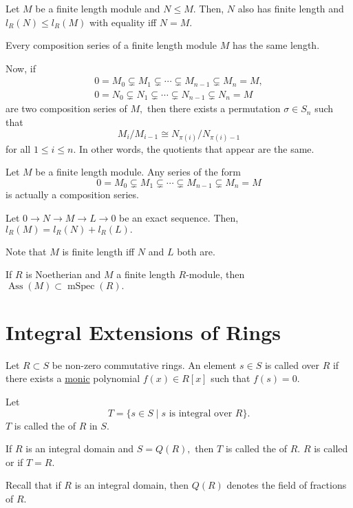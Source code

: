 \documentclass[12pt]{article}	%
\DeclareMathOperator{\Ass}{Ass}
\DeclareMathOperator{\mSpec}{mSpec}
\begin{document}
\begin{prop}
	Let $M$ be a finite length module and $N \le M.$ Then, $N$ also has finite length and $l_R(N) \le l_R(M)$ with equality iff $N = M.$
\end{prop}
\begin{thm}
	Every composition series of a finite length module $M$ has the same length.

	Now, if
	\begin{align*} 
		0 = M_0 \subsetneq M_1 \subsetneq \cdots \subsetneq M_{n-1} \subsetneq M_n = M,\\
		0 = N_0 \subsetneq N_1 \subsetneq \cdots \subsetneq N_{n-1} \subsetneq N_n = M
	\end{align*}
	are two composition series of $M,$ then there exists a permutation $\sigma \in S_n$ such that
	\begin{equation*} 
		M_{i}/M_{i - 1} \cong N_{\pi(i)}/N_{\pi(i) - 1}
	\end{equation*}
	for all $1 \le i \le n.$ In other words, the quotients that appear are the same.
\end{thm}

\begin{prop}
	Let $M$ be a finite length module. Any series of the form
	\begin{equation*} 
		0 = M_0 \subsetneq M_1 \subsetneq \cdots \subsetneq M_{n-1} \subsetneq M_n = M
	\end{equation*}
	is actually a composition series.
\end{prop}

\begin{prop}
	Let $0 \to N \to M \to L \to 0$ be an exact sequence. Then, $l_R(M) = l_R(N) + l_R(L).$
\end{prop}
Note that $M$ is finite length iff $N$ and $L$ both are.

\begin{prop}
	If $R$ is Noetherian and $M$ a finite length $R$-module, then $\Ass(M) \subset \mSpec(R).$
\end{prop}

\section{Integral Extensions of Rings}

\begin{defn}%
	Let $R \subset S$ be non-zero commutative rings. An element $s \in S$ is called  over $R$ if there exists a \underline{monic} polynomial $f(x) \in R[x]$ such that $f(s) = 0.$

	Let
	\begin{equation*} 
		T = \{s \in S \mid s \text{ is integral over }R\}.
	\end{equation*}
	$T$ is called the  of $R$ in $S.$

	If $R$ is an integral domain and $S = Q(R),$ then $T$ is called the  of $R.$ $R$ is called  or  if $T = R.$
\end{defn}
Recall that if $R$ is an integral domain, then $Q(R)$ denotes the field of fractions of $R.$
\end{document}
